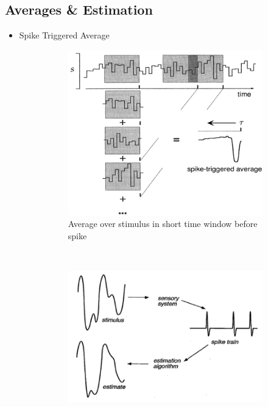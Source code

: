 \documentclass[english,11pt]{article}
\begin{document}
\subsection{Averages \& Estimation}
\begin{itemize}
\item Spike Triggered Average
\begin{figure}[H]
        \centering
        \begin{subfigure}[b]{0.5\textwidth}
                \centering
				\includegraphics[width=\textwidth]{spike-triggered-average.png}
				\caption{Average over stimulus in short time window before spike}
        \end{subfigure}%
        ~
        \begin{subfigure}[b]{0.5\textwidth}
                \centering
				\includegraphics[width=\textwidth]{stimulus-estimation.png}

\end{subfigure}
\end{figure}
\end{itemize}
\end{document}
